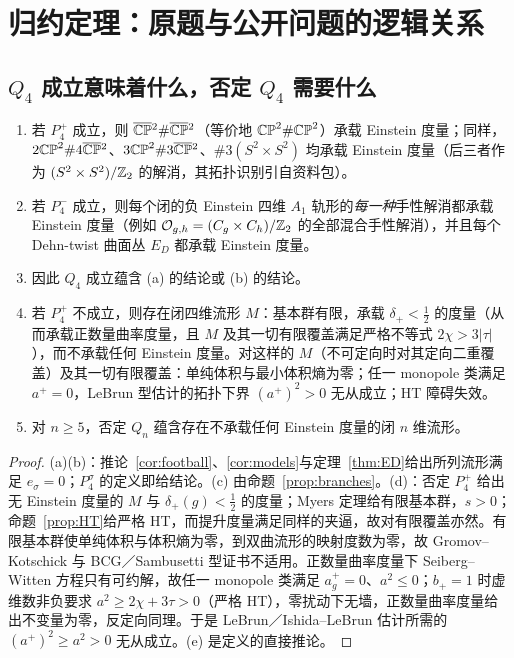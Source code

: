 \section{归约定理：原题与公开问题的逻辑关系}\label{sec:reduction}

\subsection{$Q_4$ 成立意味着什么，否定 $Q_4$ 需要什么}
\begin{theorem}[归约定理]\label{thm:R}
\begin{enumerate}
\item[(a)] 若 $P_4^+$ 成立，则 $\overline{\mathbb{CP}}{}^2\#\overline{\mathbb{CP}}{}^2$（等价地 $\mathbb{CP}^2\#\mathbb{CP}^2$）承载 Einstein 度量；同样，$2\mathbb{CP}^2\#4\overline{\mathbb{CP}}{}^2$、$3\mathbb{CP}^2\#3\overline{\mathbb{CP}}{}^2$、$\#3(S^2\times S^2)$ 均承载 Einstein 度量（后三者作为 $(S^2\times S^2)/\mathbb Z_2$ 的解消，其拓扑识别引自资料包）。
\item[(b)] 若 $P_4^-$ 成立，则每个闭的负 Einstein 四维 $A_1$ 轨形的\emph{每一种}手性解消都承载 Einstein 度量（例如 $\mathcal O_{g,h}=(C_g\times C_h)/\mathbb Z_2$ 的全部混合手性解消），并且每个 Dehn-twist 曲面丛 $E_D$ 都承载 Einstein 度量。
\item[(c)] 因此 $Q_4$ 成立蕴含 (a) 的结论或 (b) 的结论。
\item[(d)] 若 $P_4^+$ 不成立，则存在闭四维流形 $M$：基本群有限，承载 $\delta_+<\frac12$ 的度量（从而承载正数量曲率度量，且 $M$ 及其一切有限覆盖满足严格不等式 $2\chi>3|\tau|$），而不承载任何 Einstein 度量。对这样的 $M$（不可定向时对其定向二重覆盖）及其一切有限覆盖：单纯体积与最小体积熵为零；任一 monopole 类满足 $a^+=0$，LeBrun 型估计的拓扑下界 $(a^+)^2>0$ 无从成立；HT 障碍失效。
\item[(e)] 对 $n\ge5$，否定 $Q_n$ 蕴含存在不承载任何 Einstein 度量的闭 $n$ 维流形。
\end{enumerate}
\end{theorem}
\begin{proof}
(a)(b)：推论~\ref{cor:football}、\ref{cor:models}与定理~\ref{thm:ED}给出所列流形满足 $e_\sigma=0$；$P_4^\sigma$ 的定义即给结论。(c) 由命题~\ref{prop:branches}。(d)：否定 $P_4^+$ 给出无 Einstein 度量的 $M$ 与 $\delta_+(g)<\frac12$ 的度量；Myers 定理给有限基本群，$s>0$；命题~\ref{prop:HT}给严格 HT，而提升度量满足同样的夹逼，故对有限覆盖亦然。有限基本群使单纯体积与体积熵为零，到双曲流形的映射度数为零，故 Gromov--Kotschick 与 BCG／Sambusetti 型证书不适用。正数量曲率度量下 Seiberg--Witten 方程只有可约解，故任一 monopole 类满足 $a^+_g=0$、$a^2\le0$；$b_+=1$ 时虚维数非负要求 $a^2\ge2\chi+3\tau>0$（严格 HT），零扰动下无墙，正数量曲率度量给出不变量为零，反定向同理。于是 LeBrun／Ishida--LeBrun \cite{LeBrun01,IL} 估计所需的 $(a^+)^2\ge a^2>0$ 无从成立。(e) 是定义的直接推论。
\end{proof}

